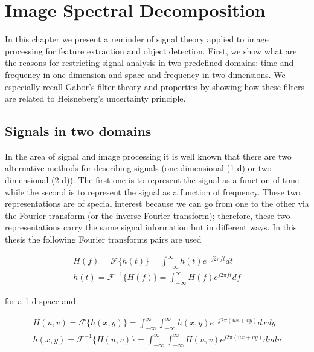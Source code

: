 
\chapter{Image Spectral Decomposition}

In this chapter we present a reminder of signal theory applied to image processing for feature extraction and object detection. First, we show what are the reasons for restricting signal analysis in two predefined domains: time and frequency in one dimension and space and frequency in two dimensions. We especially recall Gabor's filter theory and properties by showing how these filters are related to Heisneberg's uncertainty principle.

\section{Signals in two domains}

In the area of signal and image processing it is well known that there are two alternative methods for describing signals (one-dimensional (1-d) or two-dimensional (2-d)). The first one is to represent the signal as a function of time while the second is to represent the signal as a function of frequency. These two representations are of special interest because we can go from one to the other via the Fourier transform (or the inverse Fourier transform); therefore, these two representations carry the same signal information but in different ways. In this thesis the following Fourier transforms pairs are used

\begin{equation}\label{eq:fourier_transforms_1d}
    \begin{gathered}
        H(f) = \mathcal{F}\{h(t)\} = \int_{-\infty}^{\infty} h(t) e^{-j2\pi f t} dt \\
        h(t) = \mathcal{F}^{-1}\{H(f)\} = \int_{-\infty}^{\infty} H(f) e^{j2\pi f t} df 
    \end{gathered}
\end{equation}

for a 1-d space and 

\begin{equation}\label{eq:fourier_transforms_2d}
    \begin{gathered}
        H(u, v) = \mathcal{F}\{h(x, y)\} = \int_{-\infty}^{\infty} \int_{-\infty}^{\infty} h(x, y) e^{-j2\pi (ux + vy)} dx dy \\
        h(x, y) = \mathcal{F}^{-1}\{H(u, v)\} = \int_{-\infty}^{\infty} \int_{-\infty}^{\infty}  H(u, v) e^{j2\pi (ux + vy)} du dv 
    \end{gathered}
\end{equation}

